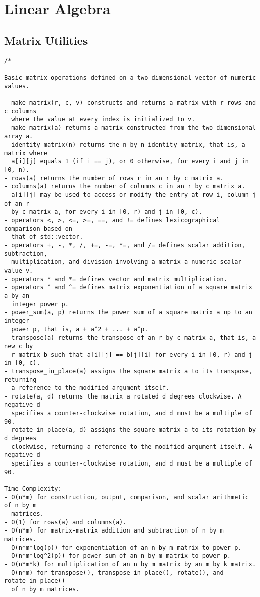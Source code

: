 \section{Linear Algebra}
\setcounter{section}{5}
\setcounter{subsection}{0}
\subsection{Matrix Utilities}
\begin{lstlisting}
/*

Basic matrix operations defined on a two-dimensional vector of numeric values.

- make_matrix(r, c, v) constructs and returns a matrix with r rows and c columns
  where the value at every index is initialized to v.
- make_matrix(a) returns a matrix constructed from the two dimensional array a.
- identity_matrix(n) returns the n by n identity matrix, that is, a matrix where
  a[i][j] equals 1 (if i == j), or 0 otherwise, for every i and j in [0, n).
- rows(a) returns the number of rows r in an r by c matrix a.
- columns(a) returns the number of columns c in an r by c matrix a.
- a[i][j] may be used to access or modify the entry at row i, column j of an r
  by c matrix a, for every i in [0, r) and j in [0, c).
- operators <, >, <=, >=, ==, and != defines lexicographical comparison based on
  that of std::vector.
- operators +, -, *, /, +=, -=, *=, and /= defines scalar addition, subtraction,
  multiplication, and division involving a matrix a numeric scalar value v.
- operators * and *= defines vector and matrix multiplication.
- operators ^ and ^= defines matrix exponentiation of a square matrix a by an
  integer power p.
- power_sum(a, p) returns the power sum of a square matrix a up to an integer
  power p, that is, a + a^2 + ... + a^p.
- transpose(a) returns the transpose of an r by c matrix a, that is, a new c by
  r matrix b such that a[i][j] == b[j][i] for every i in [0, r) and j in [0, c).
- transpose_in_place(a) assigns the square matrix a to its transpose, returning
  a reference to the modified argument itself.
- rotate(a, d) returns the matrix a rotated d degrees clockwise. A negative d
  specifies a counter-clockwise rotation, and d must be a multiple of 90.
- rotate_in_place(a, d) assigns the square matrix a to its rotation by d degrees
  clockwise, returning a reference to the modified argument itself. A negative d
  specifies a counter-clockwise rotation, and d must be a multiple of 90.

Time Complexity:
- O(n*m) for construction, output, comparison, and scalar arithmetic of n by m
  matrices.
- O(1) for rows(a) and columns(a).
- O(n*m) for matrix-matrix addition and subtraction of n by m matrices.
- O(n*m*log(p)) for exponentiation of an n by m matrix to power p.
- O(n*m*log^2(p)) for power sum of an n by m matrix to power p.
- O(n*m*k) for multiplication of an n by m matrix by an m by k matrix.
- O(n*m) for transpose(), transpose_in_place(), rotate(), and rotate_in_place()
  of n by m matrices.


\end{lstlisting}
